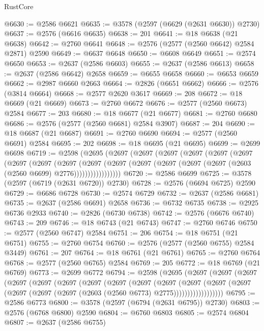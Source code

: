 \begin{lexlean}{RustCore}
\begin{coremodule}
@6630 := @2586 @6621
@6635 := @3578 (@2597 (@6629 (@2631 @6630)) @2730)
@6637 := @2576 (@6616 @6635)
@6638 := 201
@6641 := @18 @6638 (@21 @6638)
@6642 := @2760 @6641
@6648 := @2576 (@2577 (@2560 @6642) @2584 @2871) @2590
@6649 := @6637 @6648
@6650 := @6608 @6649
@6651 := @2574 @6650
@6653 := @2637 (@2586 @6603)
@6655 := @2637 (@2586 @6613)
@6658 := @2637 (@2586 @6642) @2658
@6659 := @6655 @6658
@6660 := @6653 @6659
@6662 := @2987 @6660 @2663
@6664 := @2826 (@6651 @6662)
@6666 := @2576 (@3814 @6664)
@6668 := @2577 @2620 @3617
@6669 := 208
@6672 := @18 @6669 (@21 @6669)
@6673 := @2760 @6672
@6676 := @2577 (@2560 @6673) @2584
@6677 := 203
@6680 := @18 @6677 (@21 @6677)
@6681 := @2760 @6680
@6686 := @2576 (@2577 (@2560 @6681) @2584 @3907)
@6687 := 204
@6690 := @18 @6687 (@21 @6687)
@6691 := @2760 @6690
@6694 := @2577 (@2560 @6691) @2584
@6695 := 202
@6698 := @18 @6695 (@21 @6695)
@6699 := @2699 @6698
@6719 := @2598
    (@2695
      (@2697
        (@2697
          (@2697
            (@2697
              (@2697
                (@2697
                  (@2697
                    (@2697
                      (@2697
                        (@2697
                          (@2697
                            (@2697 (@2697 (@2697 (@2697 (@2603 (@2560 @6699) @2776)))))))))))))))))
@6720 := @2586 @6699
@6725 := @3578 (@2597 (@6719 (@2631 @6720)) @2730)
@6728 := @2576 (@6694 @6725) @2590
@6729 := @6686 @6728
@6730 := @2574 @6729
@6732 := @2637 (@2586 @6681)
@6735 := @2637 (@2586 @6691) @2658
@6736 := @6732 @6735
@6738 := @2925 @6736 @2933
@6740 := @2826 (@6730 @6738)
@6742 := @2576 (@6676 @6740)
@6743 := 209
@6746 := @18 @6743 (@21 @6743)
@6747 := @2760 @6746
@6750 := @2577 (@2560 @6747) @2584
@6751 := 206
@6754 := @18 @6751 (@21 @6751)
@6755 := @2760 @6754
@6760 := @2576 (@2577 (@2560 @6755) @2584 @3449)
@6761 := 207
@6764 := @18 @6761 (@21 @6761)
@6765 := @2760 @6764
@6768 := @2577 (@2560 @6765) @2584
@6769 := 205
@6772 := @18 @6769 (@21 @6769)
@6773 := @2699 @6772
@6794 := @2598
    (@2695
      (@2697
        (@2697
          (@2697
            (@2697
              (@2697
                (@2697
                  (@2697
                    (@2697
                      (@2697
                        (@2697
                          (@2697
                            (@2697
                              (@2697
                                (@2697 (@2697 (@2697 (@2603 (@2560 @6773) @2775))))))))))))))))))
@6795 := @2586 @6773
@6800 := @3578 (@2597 (@6794 (@2631 @6795)) @2730)
@6803 := @2576 (@6768 @6800) @2590
@6804 := @6760 @6803
@6805 := @2574 @6804
@6807 := @2637 (@2586 @6755)

\end{coremodule}
\end{lexlean}
